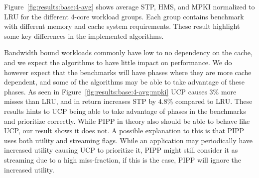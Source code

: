 
Figure~\ref{fig:results:base:4-avg} shows average STP, HMS, and MPKI normalized to LRU for the different 4-core workload groups.
Each group contains benchmark with different memory and cache system requirements.
These result highlight some key differences in the implemented algorithms.

Bandwidth bound workloads commonly have low to no dependency on the cache, and we expect the algorithms to have little impact on performance.
We do however expect that the benchmarks will have phases where they are more cache dependent, and some of the algorithms may be able to take advantage of these phases.
As seen in Figure~\ref{fig:results:base:4-avg:mpki} UCP causes 3\% more misses than LRU, and in return increases STP by 4.8\% compared to LRU.
These results hints to UCP being able to take advantage of phases in the benchmarks and prioritize correctly.
While PIPP in theory also should be able to behave like UCP, our result shows it does not.
A possible explanation to this is that PIPP uses both utility and streaming flags.
While an application may periodically have increased utility causing UCP to prioritize it, PIPP might still consider it as streaming due to a high miss-fraction, if this is the case, PIPP will ignore the increased utility.


